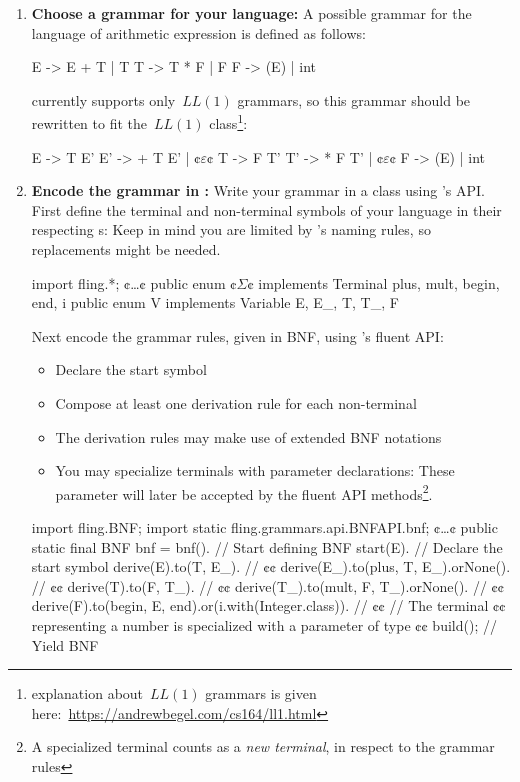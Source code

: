 \documentclass[a4paper,UKenglish,cleveref, autoref]{darts-v2019}
\begin{document}
\begin{content}
\begin{enumerate}
	\item \textbf{Choose a grammar for your language:} A possible grammar for the language
	of arithmetic expression is defined as follows:
	\begin{excerpt*}
E -> E + T | T
T -> T * F | F
F -> (E) | int
	\end{excerpt*}
	\Fling currently supports only~$LL(1)$ grammars, so this grammar should be
	rewritten to fit the~$LL(1)$ class\footnote{explanation about~$LL(1)$ grammars is given here:~\href{https://andrewbegel.com/cs164/ll1.html}{https://andrewbegel.com/cs164/ll1.html}}:
	\begin{excerpt*}
E  -> T E'
E' -> + T E' | ¢$\varepsilon$¢
T  -> F T'
T' -> * F T' | ¢$\varepsilon$¢
F  -> (E) | int
	\end{excerpt*}
	
	\item \textbf{Encode the grammar in \Java:} Write your grammar in a \Java class
	using \Fling's API.
	First define the terminal and non-terminal symbols of your language in their respecting
	s: Keep in mind you are limited by \Java's naming rules, so replacements
	might be needed.
	\begin{excerpt*}[language=java]
import fling.*;
¢\ldots¢
public enum ¢$\Sigma$¢ implements Terminal {
  plus, mult, begin, end, i
}
public enum V implements Variable {
  E, E_, T, T_, F
}
	\end{excerpt*}
	
	Next encode the grammar rules, given in BNF, using \Fling's fluent API:
	\begin{itemize}
		\item Declare the start symbol
		\item Compose at least one derivation rule for each non-terminal
		\item The derivation rules may make use of extended BNF notations
		\item You may specialize terminals with parameter declarations: These
			parameter will later be accepted by the fluent API methods\footnote{
			A specialized terminal counts as a \textit{new terminal}, in respect to the grammar rules}.
	\end{itemize}
	\begin{excerpt*}[language=java]
import fling.BNF;
import static fling.grammars.api.BNFAPI.bnf;
¢\ldots¢
public static final BNF bnf = bnf(). // Start defining BNF
  start(E). // Declare the start symbol
  derive(E).to(T, E_). // ¢¢
  derive(E_).to(plus, T, E_).orNone(). // ¢¢
  derive(T).to(F, T_). // ¢¢
  derive(T_).to(mult, F, T_).orNone(). // ¢¢
  derive(F).to(begin, E, end).or(i.with(Integer.class)). // ¢¢
  // The terminal ¢¢ representing a number is specialized with a parameter of type ¢¢
  build(); // Yield BNF
	\end{excerpt*}


\end{enumerate}
\end{content}
\end{document}
